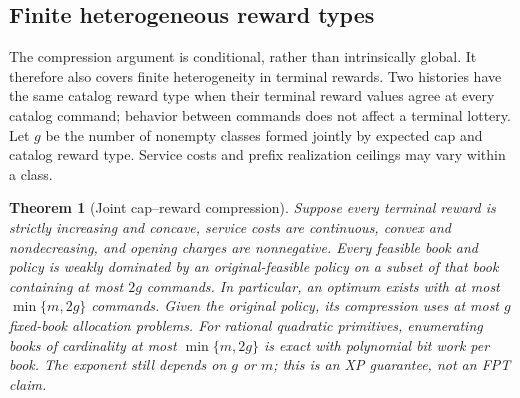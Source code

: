 \documentclass[11pt,letterpaper]{article}
\newtheorem{theorem}{Theorem}[section]
\theoremstyle{definition}\newtheorem{remark}[theorem]{Remark}
\begin{document}
\subsection{Finite heterogeneous reward types}\label{sec:types57}
The compression argument is conditional, rather than intrinsically global. It therefore also covers finite heterogeneity in terminal rewards. Two histories have the same catalog reward type when their terminal reward values agree at every catalog command; behavior between commands does not affect a terminal lottery. Let $g$ be the number of nonempty classes formed jointly by expected cap and catalog reward type. Service costs and prefix realization ceilings may vary within a class.

\begin{theorem}[Joint cap--reward compression]\label{thm:types57}
Suppose every terminal reward is strictly increasing and concave, service costs are continuous, convex and nondecreasing, and opening charges are nonnegative. Every feasible book and policy is weakly dominated by an original-feasible policy on a subset of that book containing at most $2g$ commands. In particular, an optimum exists with at most $\min\{m,2g\}$ commands. Given the original policy, its compression uses at most $g$ fixed-book allocation problems. For rational quadratic primitives, enumerating books of cardinality at most $\min\{m,2g\}$ is exact with polynomial bit work per book. The exponent still depends on $g$ or $m$; this is an XP guarantee, not an FPT claim.
\end{theorem}
\end{document}

